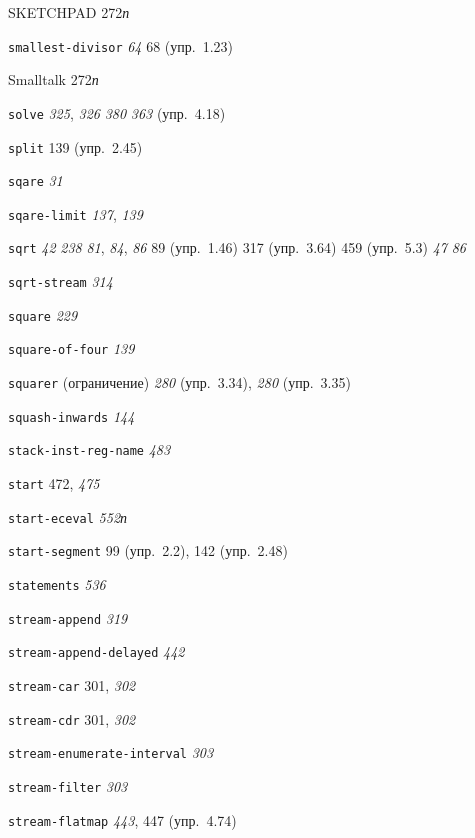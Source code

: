 \begin{theindex}
\item {SKETCHPAD} 272{\it п}
\item {\texttt{smallest-divisor}} {\it 64}
   68 (упр.~1.23)
\item {Smalltalk} 272{\it п}
\item {\texttt{solve}} {\it 325}, {\it 326}
   {\it 380}
   {\it 363} (упр.~4.18)
\item {\texttt{split}} 139 (упр.~2.45)
\item {\texttt{sqare}} {\it 31}
\item {\texttt{sqare-limit}} {\it 137}, {\it 139}
\item {\texttt{sqrt}} {\it 42}
   {\it 238}
   {\it 81}, {\it 84}, {\it 86}
   89 (упр.~1.46)
   317 (упр.~3.64)
   459 (упр.~5.3)
   {\it 47}
   {\it 86}
\item {\texttt{sqrt-stream}} {\it 314}
\item {\texttt{square}}
   {\it 229}
\item {\texttt{square-of-four}} {\it 139}
\item {\texttt{squarer} (ограничение)} {\it 280} (упр.~3.34), {\it 280} (упр.~3.35)
\item {\texttt{squash-inwards}} {\it 144}
\item {\texttt{stack-inst-reg-name}} {\it 483}
\item {\texttt{start}} 472, {\it 475}
\item {\texttt{start-eceval}} {\it 552}{\it п}
\item {\texttt{start-segment}} 99 (упр.~2.2), 142 (упр.~2.48)
\item {\texttt{statements}} {\it 536}
\item {\texttt{stream-append}} {\it 319}
\item {\texttt{stream-append-delayed}} {\it 442}
\item {\texttt{stream-car}} 301, {\it 302}
\item {\texttt{stream-cdr}} 301, {\it 302}
\item {\texttt{stream-enumerate-interval}} {\it 303}
\item {\texttt{stream-filter}} {\it 303}
\item {\texttt{stream-flatmap}} {\it 443}, 447 (упр.~4.74)

\end{theindex}
